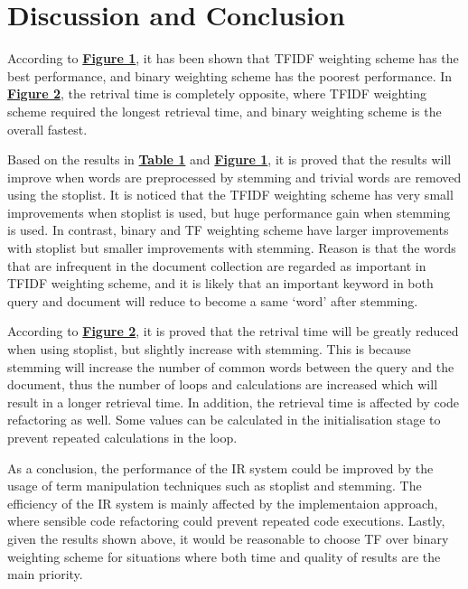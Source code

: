 \documentclass[12pt, a4paper]{article}
\begin{document}
\section{Discussion and Conclusion}
According to \hyperref[figure:f-measure]{\textbf{Figure 1}}, it has been shown that TFIDF weighting
scheme has the best performance, and binary weighting scheme has the poorest performance. In
\hyperref[figure:retrieval]{\textbf{Figure 2}}, the retrival time is completely opposite, where
TFIDF weighting scheme required the longest retrieval time, and binary weighting scheme is the
overall fastest.

Based on the results in \hyperref[figure:f-measure]{\textbf{Table 1}} and
\hyperref[figure:f-measure]{\textbf{Figure 1}}, it is proved that the results will improve when
words are preprocessed by stemming and trivial words are removed using the stoplist. It is noticed
that the TFIDF weighting scheme has very small improvements when stoplist is used, but huge
performance gain when stemming is used. In contrast, binary and TF weighting scheme have larger
improvements with stoplist but smaller improvements with stemming. Reason is that the words that are
infrequent in the document collection are regarded as important in TFIDF weighting scheme, and it is
likely that an important keyword in both query and document will reduce to become a same `word'
after stemming.

According to \hyperref[figure:retrieval]{\textbf{Figure 2}}, it is proved that the retrival time
will be greatly reduced when using stoplist, but slightly increase with stemming. This is because
stemming will increase the number of common words between the query and the document, thus the
number of loops and calculations are increased which will result in a longer retrieval time. In
addition, the retrieval time is affected by code refactoring as well. Some values can be calculated
in the initialisation stage to prevent repeated calculations in the loop.

As a conclusion, the performance of the IR system could be improved by the usage of term
manipulation techniques such as stoplist and stemming. The efficiency of the IR system is mainly
affected by the implementaion approach, where sensible code refactoring could prevent repeated code
executions. Lastly, given the results shown above, it would be reasonable to choose TF over binary
weighting scheme for situations where both time and quality of results are the main priority.
\end{document}
